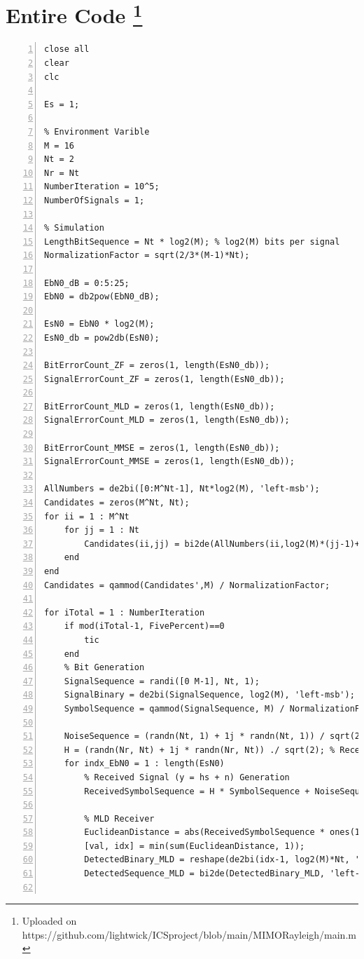 \documentclass{article}
\begin{document}
\section[Entire Code]{Entire Code \footnote{Uploaded on https://github.com/lightwick/ICS\textunderscore project/blob/main/MIMO\textunderscore Rayleigh/main.m}}
\begin{lstlisting}[style=Matlab-editor, frame=single, numbers=left,]
close all
clear
clc

Es = 1;

% Environment Varible
M = 16
Nt = 2
Nr = Nt
NumberIteration = 10^5;
NumberOfSignals = 1;

% Simulation
LengthBitSequence = Nt * log2(M); % log2(M) bits per signal
NormalizationFactor = sqrt(2/3*(M-1)*Nt);

EbN0_dB = 0:5:25;
EbN0 = db2pow(EbN0_dB);

EsN0 = EbN0 * log2(M);
EsN0_db = pow2db(EsN0);

BitErrorCount_ZF = zeros(1, length(EsN0_db));
SignalErrorCount_ZF = zeros(1, length(EsN0_db));

BitErrorCount_MLD = zeros(1, length(EsN0_db));
SignalErrorCount_MLD = zeros(1, length(EsN0_db));

BitErrorCount_MMSE = zeros(1, length(EsN0_db));
SignalErrorCount_MMSE = zeros(1, length(EsN0_db));

AllNumbers = de2bi([0:M^Nt-1], Nt*log2(M), 'left-msb');
Candidates = zeros(M^Nt, Nt);
for ii = 1 : M^Nt
    for jj = 1 : Nt
        Candidates(ii,jj) = bi2de(AllNumbers(ii,log2(M)*(jj-1)+1:log2(M)*jj), 'left-msb');
    end
end
Candidates = qammod(Candidates',M) / NormalizationFactor;

for iTotal = 1 : NumberIteration
    if mod(iTotal-1, FivePercent)==0
        tic
    end
    % Bit Generation
    SignalSequence = randi([0 M-1], Nt, 1);
    SignalBinary = de2bi(SignalSequence, log2(M), 'left-msb');
    SymbolSequence = qammod(SignalSequence, M) / NormalizationFactor;
    
    NoiseSequence = (randn(Nt, 1) + 1j * randn(Nt, 1)) / sqrt(2); % Noise (n) Generation
    H = (randn(Nr, Nt) + 1j * randn(Nr, Nt)) ./ sqrt(2); % Receiver x Transmitter
    for indx_EbN0 = 1 : length(EsN0)
        % Received Signal (y = hs + n) Generation
        ReceivedSymbolSequence = H * SymbolSequence + NoiseSequence * sqrt(1 / EsN0(indx_EbN0)); % log2(M)x1 matrix
        
        % MLD Receiver
        EuclideanDistance = abs(ReceivedSymbolSequence * ones(1,M^Nt) - H*Candidates).^2; % results in Nt x M^Nt, each column representing each candidate symbol combination
        [val, idx] = min(sum(EuclideanDistance, 1));
        DetectedBinary_MLD = reshape(de2bi(idx-1, log2(M)*Nt, 'left-msb'),log2(M),[])'; % MOST LIKELY WRONG
        DetectedSequence_MLD = bi2de(DetectedBinary_MLD, 'left-msb');
        

\end{lstlisting}
\end{document}
